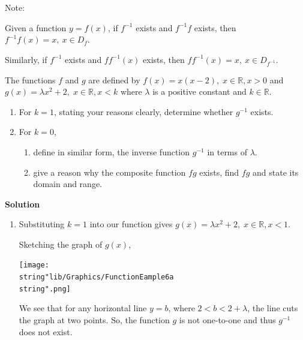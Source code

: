 \documentclass[11pt,a4paper]{book}
\newcommand{\R}{\mathbb{R}}
\begin{document}
Note: 

Given a function $y=f\left(x\right)$, if $f^{-1}$ exists and $f^{-1}f$
exists, then $f^{-1}f\left(x\right)=x,\:x\in D_{f}$.

Similarly, if $f^{-1}$ exists and $ff^{-1}\left(x\right)$ exists,
then $ff^{-1}\left(x\right)=x,\:x\in D_{f^{-1}}$.

\newpage

\begin{example}{}

The functions $f$ and $g$ are defined by $f\left(x\right)=x\left(x-2\right),\;x\in\R,x>0$ and $g\left(x\right)=\lambda x^{2}+2,\;x\in\R,x<k$ where $\lambda$ is a positive constant and $k\in\R$.

\begin{enumerate}[label=(\alph*)]

\item  For $k=1$, stating your reasons clearly, determine whether
$g^{-1}$ exists.

\item  For $k=0$,

\begin{enumerate}[label=(\roman*)]

\item  define in similar form, the inverse function $g^{-1}$ in
terms of $\lambda$.

\item  give a reason why the composite function $fg$ exists, find
$fg$ and state its domain and range.

\end{enumerate}
\end{enumerate}

\textbf{Solution}

\begin{enumerate}[label=(\alph*)]

\item  Substituting $k=1$ into our function gives $g\left(x\right)=\lambda x^{2}+2,\;x\in\R,x<1$.

Sketching the graph of $g\left(x\right)$,
\begin{center}
\texttt{[image: \\string"lib/Graphics/FunctionEample6a\\string".png]}
\par\end{center}

We see that for any horizontal line $y=b$, where $2<b<2+\lambda$,
the line cuts the graph at two points. So, the function $g$ is not
one-to-one and thus $g^{-1}$ does not exist.


\end{enumerate}
\end{example}
\end{document}
